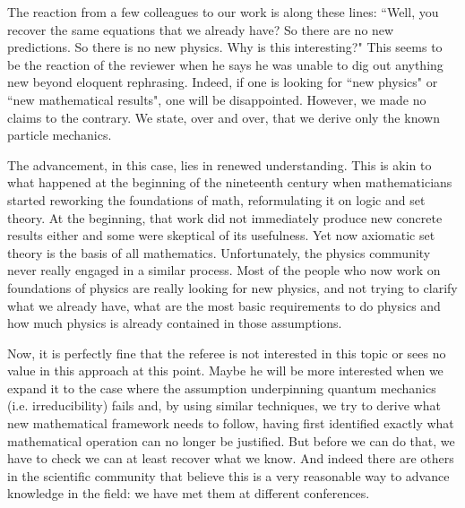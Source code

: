\documentclass[10pt]{article}
\begin{document}
\begin{response}
The reaction from a few colleagues to our work is along these lines: ``Well, you recover the same equations that we already have? So there are no new predictions. So there is no new physics. Why is this interesting?" This seems to be the reaction of the reviewer when he says he was unable to dig out anything new beyond eloquent rephrasing. Indeed, if one is looking for ``new physics" or ``new mathematical results", one will be disappointed. However, we made no claims to the contrary. We state, over and over, that we derive only the known particle mechanics.

The advancement, in this case, lies in renewed understanding. This is akin to what happened at the beginning of the nineteenth century when mathematicians started reworking the foundations of math, reformulating it on logic and set theory. At the beginning, that work did not immediately produce new concrete results either and some were skeptical of its usefulness. Yet now axiomatic set theory is the basis of all mathematics. Unfortunately, the physics community never really engaged in a similar process. Most of the people who now work on foundations of physics are really looking for new physics, and not trying to clarify what we already have, what are the most basic requirements to do physics and how much physics is already contained in those assumptions.

Now, it is perfectly fine that the referee is not interested in this topic or sees no value in this approach at this point. Maybe he will be more interested when we expand it to the case where the assumption underpinning quantum mechanics (i.e. irreducibility) fails and, by using similar techniques, we try to derive what new mathematical framework needs to follow, having first identified exactly what mathematical operation can no longer be justified. But before we can do that, we have to check we can at least recover what we know. And indeed there are others in the scientific community that believe this is a very reasonable way to advance knowledge in the field: we have met them at different conferences.

\end{response}
\end{document}
